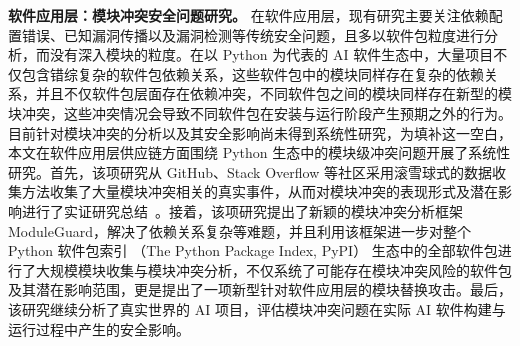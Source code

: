 \textbf{软件应用层：模块冲突安全问题研究。}
在软件应用层，现有研究主要关注依赖配置错误、已知漏洞传播以及漏洞检测等传统安全问题，且多以软件包粒度进行分析，而没有深入模块的粒度。在以 Python 为代表的 AI 软件生态中，大量项目不仅包含错综复杂的软件包依赖关系，这些软件包中的模块同样存在复杂的依赖关系，并且不仅软件包层面存在依赖冲突，不同软件包之间的模块同样存在新型的模块冲突，这些冲突情况会导致不同软件包在安装与运行阶段产生预期之外的行为。
目前针对模块冲突的分析以及其安全影响尚未得到系统性研究，为填补这一空白，本文在软件应用层供应链方面围绕 Python 生态中的模块级冲突问题开展了系统性研究。首先，该项研究从 GitHub、Stack Overflow 等社区采用滚雪球式的数据收集方法收集了大量模块冲突相关的真实事件，从而对模块冲突的表现形式及潜在影响进行了实证研究总结~\cite{github-website,stackoverflow-website}。接着，该项研究提出了新颖的模块冲突分析框架 ModuleGuard，解决了依赖关系复杂等难题，并且利用该框架进一步对整个 Python 软件包索引 （The Python Package Index, PyPI） 生态中的全部软件包进行了大规模模块收集与模块冲突分析，不仅系统了可能存在模块冲突风险的软件包及其潜在影响范围，更是提出了一项新型针对软件应用层的模块替换攻击。最后，该研究继续分析了真实世界的 AI 项目，评估模块冲突问题在实际 AI 软件构建与运行过程中产生的安全影响。

